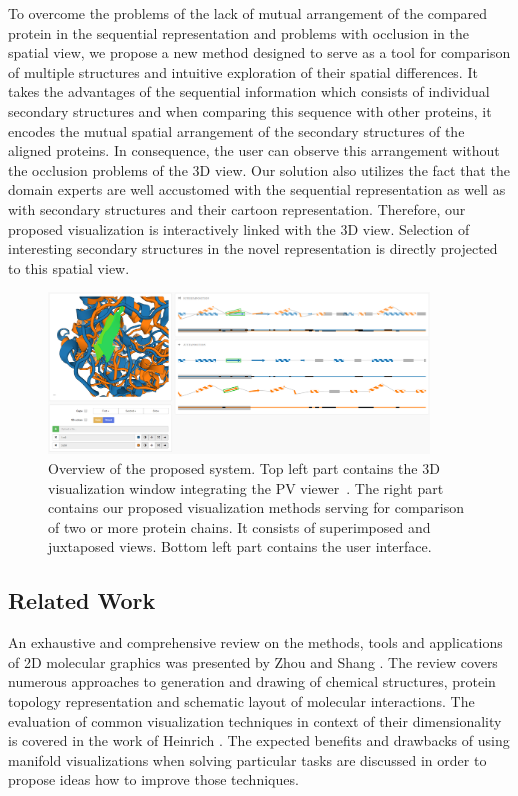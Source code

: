 \documentclass[twocolumn]{bmcart}%
\begin{document}
To overcome the problems of the lack of mutual arrangement of the compared protein in the sequential representation and problems with occlusion in the spatial view, we propose a new method designed to serve as a tool for comparison of multiple structures and intuitive exploration of their spatial differences.
It takes the advantages of the sequential information which consists of individual secondary structures and when comparing this sequence with other proteins, it encodes the mutual spatial arrangement of the secondary structures of the aligned proteins.
In consequence, the user can observe this arrangement without the occlusion problems of the 3D view.
Our solution also utilizes the fact that the domain experts are well accustomed with the sequential representation as well as with secondary structures and their cartoon representation. 
Therefore, our proposed visualization is interactively linked with the 3D view.
Selection of interesting secondary structures in the novel representation is directly projected to this spatial view. 

\begin{figure}[t]
  \centering
  \includegraphics[width=0.9\textwidth]{pics/flattening_design2.png}
  \caption{Overview of the proposed system. Top left part contains the 3D visualization window integrating the PV viewer~\cite{biasini2014}. The right part contains our proposed visualization methods serving for comparison of two or more protein chains. It consists of superimposed and juxtaposed views. Bottom left part contains the user interface.}
  \label{fig:design}
\end{figure}

\subsection*{Related Work}

An exhaustive and comprehensive review on the methods, tools and applications of 2D molecular graphics was presented by Zhou and Shang \cite{Zhou2009}. 
The review covers numerous approaches to generation and drawing of chemical structures, protein topology representation and schematic layout of molecular interactions.
The evaluation of common visualization techniques in context of their dimensionality is covered in the work of Heinrich \cite{Heinrich2014}.
The expected benefits and drawbacks of using manifold visualizations when solving particular tasks are discussed in order to propose ideas how to improve those techniques.
\end{document}
